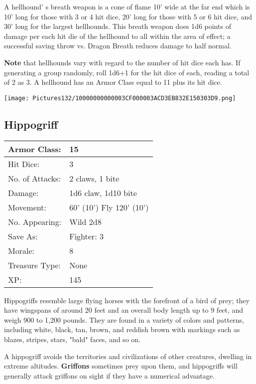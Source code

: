 \documentclass[a4paper,twoside,openany,10pt]{book}
\begin{document}
\begin{multicols}{2}
A hellhound' s breath weapon is a cone of flame 10' wide at the far end which is 10' long for those with 3 or 4 hit dice, 20' long for those with 5 or 6 hit dice, and 30' long for the largest hellhounds. This breath weapon does 1d6 points of damage per each hit die of the hellhound to all within the area of effect; a successful saving throw vs. Dragon Breath reduces damage to half normal. 

\textbf{Note} that hellhounds vary with regard to the number of hit dice each has. If generating a group randomly, roll 1d6+1 for the hit dice of each, reading a total of 2 as 3. A hellhound has an Armor Class equal to 11 plus its hit dice.


\begin{center}
	\texttt{[image: Pictures132/10000000000003CF000003ACD3EB832E150303D9.png]}
\end{center}

\subsection*{Hippogriff}\label{hippogriff}

\begin{tabularx}{0.48\textwidth}{@{}lX@{}}
Armor Class: & 15 \\\hline
Hit Dice: & 3 \\\hline
No. of Attacks: & 2 claws, 1 bite \\\hline
Damage: & 1d6 claw, 1d10 bite \\\hline
Movement: & 60' (10') Fly
120' (10') \\\hline
No. Appearing: & Wild 2d8 \\\hline
Save As: & Fighter: 3 \\\hline
Morale: & 8 \\\hline
Treasure Type: & None \\\hline
XP: & 145 \\\hline
\end{tabularx}\medskip

Hippogriffs resemble large flying horses with the forefront of a bird of prey; they have wingspans of around 20 feet and an overall body length up to 9 feet, and weigh 900 to 1,200 pounds. They are found in a variety of colors and patterns, including white, black, tan, brown, and reddish brown with markings such as blazes, stripes, stars, "bald" faces, and so on.

A hippogriff avoids the territories and civilizations of other creatures, dwelling in extreme altitudes. \textbf{Griffons} sometimes prey upon them, and hippogriffs will generally attack griffons on sight if they have a numerical advantage.


\end{multicols}
\end{document}
